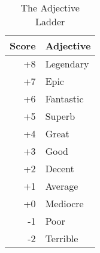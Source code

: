 
\begin{wraptable}{r}[\sidebarwidth]{3\sidebarwidth}
\centering
\begin{tabular}{r@{:\quad}l}
\toprule
Score	& Adjective \\
\midrule
+8	& Legendary \\
+7	& Epic \\
+6	& Fantastic \\
+5	& Superb \\
+4	& Great \\
+3	& Good \\
+2	& Decent \\
+1	& Average \\
+0	& Mediocre \\
-1	& Poor \\
-2	& Terrible \\
\bottomrule
\end{tabular}
\caption[The Adjective Ladder]{The Adjective Ladder}
\label{tab:the-ladder}
\end{wraptable}
